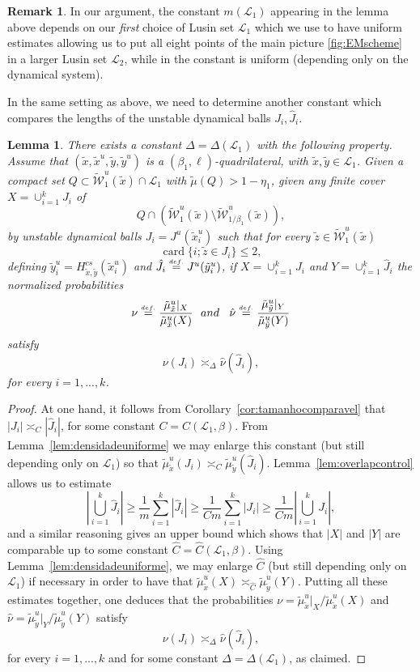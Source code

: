 \documentclass[a4paper,11pt,reqno]{amsart}
\newcommand{\cL}{{\mathcal L}}
\newcommand{\cW}{{\mathcal W}}
\newcommand{\card}{\operatorname{card}}
\newcommand{\eqdef}{\stackrel{\scriptscriptstyle\textrm def.}{=}}
\newcommand{\tix}{\tilde{x}}
\newcommand{\tm}{\tilde{\mu}}
\newtheorem{lemma}[theorem]{Lemma}
\theoremstyle{definition}
\newtheorem{remark}{Remark}
\begin{document}
\begin{remark}
In our argument, the constant $m(\cL_1)$ appearing in the lemma above depends on our \emph{first} choice of Lusin set $\cL_1$ which we use to have uniform estimates allowing us to put all eight points of the main picture \ref{fig:EMscheme} in a larger Lusin set $\cL_2$, while in \cite{ALOS} the constant is uniform (depending only on the dynamical system).
\end{remark}

In the same setting as above, we need to determine another constant which compares the lengths of the unstable dynamical balls $J_i,\hat{J}_i$. 

\begin{lemma}
\label{lem:lengthcontrol}
There exists a constant $\Delta=\Delta(\cL_1)$ with the following property. Assume that $(\tix,\tix^u,\tilde{y},\tilde{y}^u)$ is a $(\beta_1,\ell)$-quadrilateral, with $\tix,\tilde{y}\in\cL_1$. Given a compact set $Q\subset\widetilde{\cW}^u_1(\tix)\cap\cL_1$ with $\tm(Q)>1-\eta_1$, given any finite cover $X=\cup_{i=1}^kJ_i$ of 
\[
Q\cap\left(\widetilde{\cW}^u_1(\tix)\setminus\widetilde{\cW}^u_{1/\beta_1}(\tix)\right),
\]
by unstable dynamical balls $J_i=J^u(\tix^u_i)$ such that for every $\tilde{z}\in\widetilde{\cW}^u_1(\tix)$
\[
\card\{i;\tilde{z}\in J_i\}\leq 2,
\]
defining $\tilde{y}^u_i=H^{cs}_{\tix,\tilde{y}}(\tix^u_i)$ and $\hat{J}_i\eqdef J^u(\tilde{y}^u_i)$, if $X=\cup_{i=1}^kJ_i$ and $Y=\cup_{i=1}^k\hat{J}_i$ the normalized probabilities 
\[
\nu\eqdef\frac{\tm^u_{\tix}|_X}{\tm^u_{\tix}(X)}\:\:\:\textrm{and}\:\:\:\:\hat{\nu}\eqdef\frac{\tm^u_{\tilde{y}}|_Y}{\tm^u_{\tilde{y}}(Y)}
\] 
satisfy
\[
\nu(J_i)\asymp_{\Delta}\hat{\nu}(\hat{J}_i),
\]
for every $i=1,...,k$.
\end{lemma}
\begin{proof}
At one hand, it follows from Corollary~\ref{cor:tamanhocomparavel} that $|J_i|\asymp_C|\hat{J}_i|$, for some constant $C=C(\cL_1,\beta)$. From Lemma~\ref{lem:densidadeuniforme} we may enlarge this constant (but still depending only on $\cL_1$) so that $\tm^u_{\tix}(J_i)\asymp_{C}\tm^u_{\tilde{y}}(\hat{J}_i)$.  	
 Lemma~\ref{lem:overlapcontrol} allows us to estimate 
\[
\left|\bigcup_{i=1}^k\hat{J}_i\right|\geq\frac{1}{m}\sum_{i=1}^k|\hat{J}_i|\geq\frac{1}{Cm}\sum_{i=1}^k|J_i|\geq\frac{1}{Cm}\left|\bigcup_{i=1}^k J_i\right|,
\]
and a similar reasoning gives an upper bound which shows that $|X|$ and $|Y|$ are comparable up to some constant $\hat{C}=\hat{C}(\cL_1,\beta)$. Using Lemma~\ref{lem:densidadeuniforme}, we may enlarge $\hat{C}$ (but still depending only on $\cL_1$) if necessary in order to have that $\tm^u_{\tix}(X)\asymp_{\hat{C}}\tm^u_{\tilde{y}}(Y)$. Putting all these estimates together, one deduces that the probabilities $\nu=\tm^u_{\tix}|_X/\tm^u_{\tix}(X)$ and $\hat{\nu}=\tm^u_{\tilde{y}}|_Y/\tm^u_{\tilde{y}}(Y)$ satisfy  
\[
\nu(J_i)\asymp_{\Delta}\hat{\nu}(\hat{J}_i),
\]
for every $i=1,...,k$ and for some constant $\Delta=\Delta(\cL_1)$, as claimed.
\end{proof}
\end{document}
